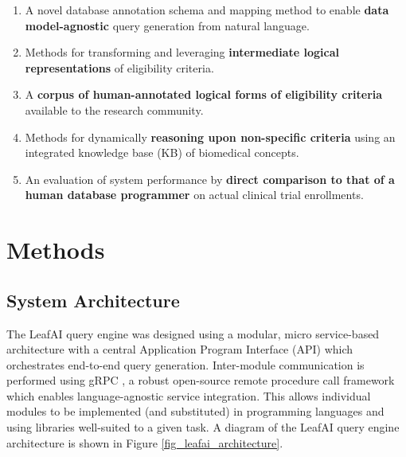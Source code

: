 \documentclass[../main.tex]{subfiles}
\begin{document}
\begin{enumerate}
    \item{A novel database annotation schema and mapping method to enable \textbf{data model-agnostic} query generation from natural language.}
    \item{Methods for transforming and leveraging \textbf{intermediate logical representations} of eligibility criteria.}
    \item{A \textbf{corpus of human-annotated logical forms of eligibility criteria} available to the research community.}
    \item{Methods for dynamically \textbf{reasoning upon non-specific criteria} using an integrated knowledge base (KB) of biomedical concepts.}
    \item{An evaluation of system performance by \textbf{direct comparison to that of a human database programmer} on actual clinical trial enrollments}.
\end{enumerate}

\section{Methods}

\subsection{System Architecture}

The LeafAI query engine was designed using a modular, micro service-based architecture with a central Application Program Interface (API) which orchestrates end-to-end query generation. Inter-module communication is performed using gRPC \cite{grpc}, a robust open-source remote procedure call framework which enables language-agnostic service integration. This allows individual modules to be implemented (and substituted) in programming languages and using libraries well-suited to a given task. A diagram of the LeafAI query engine architecture is shown in Figure \ref{fig_leafai_architecture}. 
\end{document}
